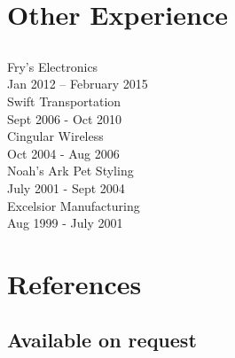 \documentclass[letterpaper]{deedy-resume} %
\begin{document}

\newpage

\begin{minipage}[t]{0.33\textwidth} %
\section{Other Experience}
\subsection{} 
Fry's Electronics\\
Jan 2012 – February 2015\\
\sectionspace
{}
Swift Transportation\\
Sept 2006 - Oct 2010\\
\sectionspace
{}
Cingular Wireless\\
Oct 2004 - Aug 2006\\
\sectionspace
{}
Noah's Ark Pet Styling\\
July 2001 - Sept 2004\\
\sectionspace
{}
Excelsior Manufacturing\\
Aug 1999 - July 2001\\
\sectionspace %
\section{References}
\subsection{Available on request}
\end{minipage} %
\hfill
%
\end{document}
